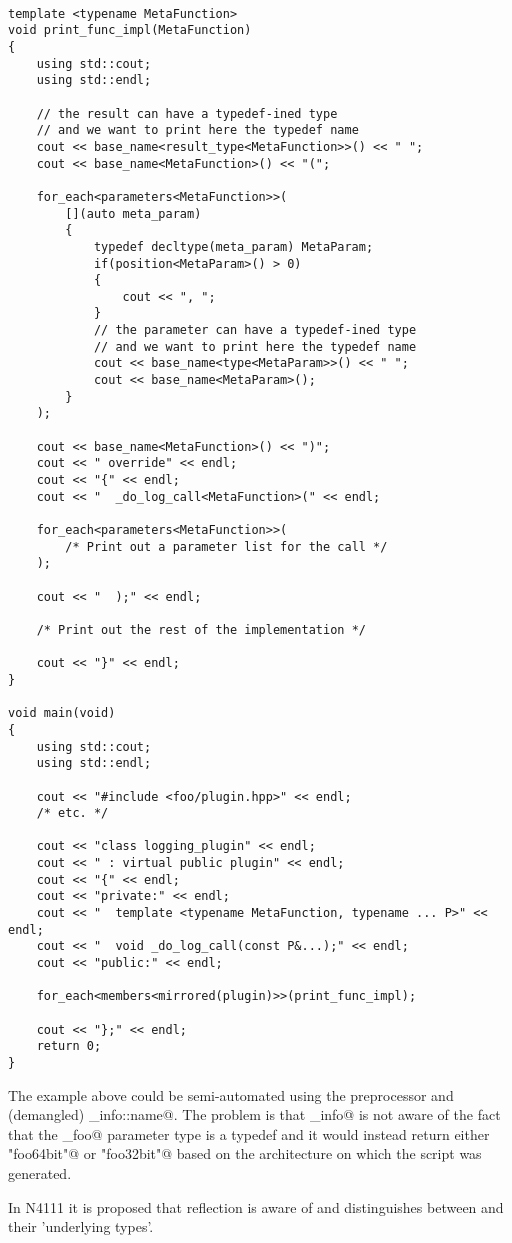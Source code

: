 \begin{verbatim}

template <typename MetaFunction>
void print_func_impl(MetaFunction)
{
	using std::cout;
	using std::endl;

	// the result can have a typedef-ined type
	// and we want to print here the typedef name
	cout << base_name<result_type<MetaFunction>>() << " ";
	cout << base_name<MetaFunction>() << "(";

	for_each<parameters<MetaFunction>>(
		[](auto meta_param)
		{
			typedef decltype(meta_param) MetaParam;
			if(position<MetaParam>() > 0)
			{
				cout << ", ";
			}
			// the parameter can have a typedef-ined type
			// and we want to print here the typedef name
			cout << base_name<type<MetaParam>>() << " ";
			cout << base_name<MetaParam>();
		}
	);

	cout << base_name<MetaFunction>() << ")";
	cout << " override" << endl;
	cout << "{" << endl;
	cout << "  _do_log_call<MetaFunction>(" << endl;

	for_each<parameters<MetaFunction>>(
		/* Print out a parameter list for the call */
	);

	cout << "  );" << endl;

	/* Print out the rest of the implementation */

	cout << "}" << endl;
}

void main(void)
{
	using std::cout;
	using std::endl;

	cout << "#include <foo/plugin.hpp>" << endl;
	/* etc. */

	cout << "class logging_plugin" << endl;
	cout << " : virtual public plugin" << endl;
	cout << "{" << endl;
	cout << "private:" << endl;
	cout << "  template <typename MetaFunction, typename ... P>" << endl;
	cout << "  void _do_log_call(const P&...);" << endl;
	cout << "public:" << endl;

	for_each<members<mirrored(plugin)>>(print_func_impl);

	cout << "};" << endl;
	return 0;
}

\end{verbatim}

The example above could be semi-automated using the preprocessor
and (demangled) \verb@type_info::name@. The problem is that
\verb@type_info@ is not aware of the fact that the \verb@default_foo@
parameter type is a typedef and it would instead return either
\verb@"foo64bit"@ or \verb@"foo32bit"@ based on the architecture
on which the script was generated.

In N4111 it is proposed that reflection is aware of and distinguishes between
\verb@typedef@s and their 'underlying types'.
